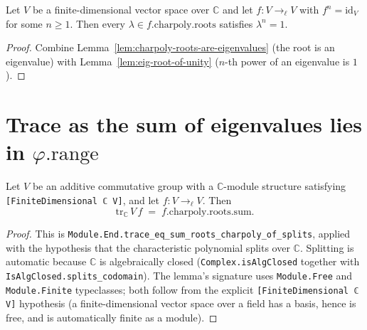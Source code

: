 \begin{lemma}
  \label{lem:charpoly-roots-root-of-unity}
  \leanok
  Let $V$ be a finite-dimensional vector space over $\mathbb{C}$ and let $f : V \to_{\ell} V$ with $f^n = \mathrm{id}_V$ for some $n \geq 1$.  Then every $\lambda \in f.\mathrm{charpoly}.\mathrm{roots}$ satisfies $\lambda^n = 1$.
\end{lemma}
\begin{proof}
  Combine Lemma~\ref{lem:charpoly-roots-are-eigenvalues} (the root is an eigenvalue) with Lemma~\ref{lem:eig-root-of-unity} ($n$-th power of an eigenvalue is $1$).
\end{proof}

\section{Trace as the sum of eigenvalues lies in $\varphi.\mathrm{range}$}

\begin{lemma}
  \label{lem:trace-sum-roots}
  \leanok
  Let $V$ be an additive commutative group with a $\mathbb{C}$-module structure satisfying \verb|[FiniteDimensional ℂ V]|, and let $f : V \to_{\ell} V$.  Then
  \[
    \mathrm{tr}_{\mathbb{C}}\,V\,f \; = \; f.\mathrm{charpoly}.\mathrm{roots}.\mathrm{sum}.
  \]
\end{lemma}
\begin{proof}
  This is \verb|Module.End.trace_eq_sum_roots_charpoly_of_splits|, applied with the hypothesis that the characteristic polynomial splits over $\mathbb{C}$.  Splitting is automatic because $\mathbb{C}$ is algebraically closed (\verb|Complex.isAlgClosed| together with \verb|IsAlgClosed.splits_codomain|).  The lemma's signature uses \verb|Module.Free| and \verb|Module.Finite| typeclasses; both follow from the explicit \verb|[FiniteDimensional ℂ V]| hypothesis (a finite-dimensional vector space over a field has a basis, hence is free, and is automatically finite as a module).
\end{proof}

